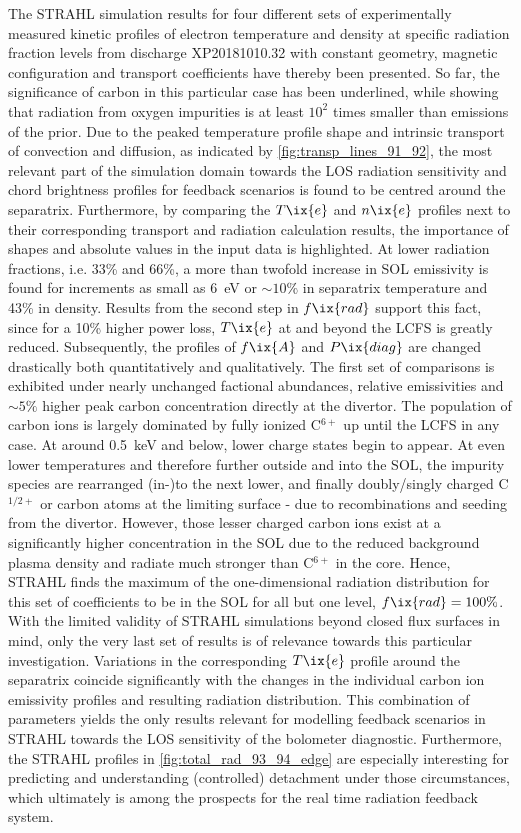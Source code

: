        The STRAHL simulation results for four different sets of experimentally measured kinetic profiles of electron temperature and density at specific radiation fraction levels from discharge XP20181010.32 with constant geometry, magnetic configuration and transport coefficients have thereby been presented. So far, the significance of carbon in this particular case has been underlined, while showing that radiation from oxygen impurities is at least $10^{2}$ times smaller than emissions of the prior. Due to the peaked temperature profile shape and intrinsic transport of convection and diffusion, as indicated by \cref{fig:transp_lines_91_92}, the most relevant part of the simulation domain towards the LOS radiation sensitivity and chord brightness profiles for feedback scenarios is found to be centred around the separatrix. Furthermore, by comparing the $T\ix{e}$ and $n\ix{e}$ profiles next to their corresponding transport and radiation calculation results, the importance of shapes and absolute values in the input data is highlighted. At lower radiation fractions, i.e. 33\% and 66\%, a more than twofold increase in SOL emissivity is found for increments as small as \SI{6}{\electronvolt} or $\sim10\%$ in separatrix temperature and 43\% in density. Results from the second step in $f\ix{rad}$ support this fact, since for a 10\% higher power loss, $T\ix{e}$ at and beyond the LCFS is greatly reduced. Subsequently, the profiles of $f\ix{A}$ and $P\ix{diag}$ are changed drastically both quantitatively and qualitatively. The first set of comparisons is exhibited under nearly unchanged factional abundances, relative emissivities and $\sim5\%$ higher peak carbon concentration directly at the divertor. The population of carbon ions is largely dominated by fully ionized C$^{6+}$ up until the LCFS in any case. At around \SI{0.5}{\kilo\electronvolt} and below, lower charge states begin to appear. At even lower temperatures and therefore further outside and into the SOL, the impurity species are rearranged (in-)to the next lower, and finally doubly/singly charged C$^{1/2+}$ or carbon atoms at the limiting surface - due to recombinations and seeding from the divertor. However, those lesser charged carbon ions exist at a significantly higher concentration in the SOL due to the reduced background plasma density and radiate much stronger than C$^{6+}$ in the core. Hence, STRAHL finds the maximum of the one-dimensional radiation distribution for this set of coefficients to be in the SOL for all but one level, $f\ix{rad}=100\%$. With the limited validity of STRAHL simulations beyond closed flux surfaces in mind, only the very last set of results is of relevance towards this particular investigation. Variations in the corresponding $T\ix{e}$ profile around the separatrix coincide significantly with the changes in the individual carbon ion emissivity profiles and resulting radiation distribution. This combination of parameters yields the only results relevant for modelling feedback scenarios in STRAHL towards the LOS sensitivity of the bolometer diagnostic. Furthermore, the STRAHL profiles in \cref{fig:total_rad_93_94_edge} are especially interesting for predicting and understanding (controlled) detachment under those circumstances, which ultimately is among the prospects for the real time radiation feedback system.%
%
